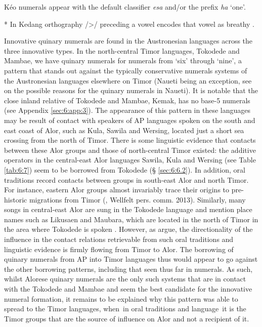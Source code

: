 \begin{table}
\vspace{.5cm}
\normalsize
  {\dag} K\'eo numerals appear with the default classifier \textit{{\textglotstop}esa} and/or the prefix \textit{ha} `one'.

      * In Kedang orthography /{\textgreater}/ preceding a vowel encodes that vowel as breathy \citep{Samely1991}.


\label{tab:6:10}
\end{table}

    Innovative quinary numerals are found in the Austronesian languages across the three innovative types. In the north-central Timor languages, Tokodede and Mambae, we have quinary numerals for numerals from `six' through `nine', a pattern that stands out against the typically conservative numerals systems of the Austronesian languages elsewhere on Timor (Naueti being an exception, see \citet{SchapperEtAl2013} on the possible reasons for the quinary numerals in Naueti). It is notable that the close inland relative of Tokodede and Mambae, Kemak, has no base-5 numerals (see Appendix \ref{sec:6:app:3}). The appearance of this pattern in these languages may be result of contact with speakers of AP languages spoken on the south and east coast of Alor, such as Kula, Sawila and Wersing, located just a short sea crossing from the north of Timor. There is some linguistic evidence that contacts between these Alor groups and those of north-central Timor existed: the additive operators in the central-east Alor languages Sawila, Kula and Wersing (see Table \ref{tab:6:7}) seem to be borrowed from Tokodede ({\S} \ref{sec:6:6.2}). In addition, oral traditions record contacts between groups in south-east Alor and north Timor. For instance, eastern Alor groups almost invariably trace their origins to pre-historic migrations from Timor (\citealt{WellfeltEtAl2013}, Wellfelt pers. comm. 2013). Similarly, many songs in central-east Alor are sung in the Tokodede language and mention place names such as Likusaen and Maubara, which are located in the north of Timor in the area where Tokodede is spoken \citep{WellfeltEtAl2013}. However, as \citet{WellfeltEtAl2013} argue, the directionality of the influence in the contact relations retrievable from such oral traditions and linguistic evidence is firmly flowing from Timor to Alor. The borrowing of quinary numerals from AP into Timor languages thus would appear to go against the other borrowing patterns, including that seen thus far in numerals. As such, whilst Alorese quinary numerals are the only such systems that are in contact with the Tokodede and Mambae and seem the best candidate for the innovative numeral formation, it remains to be explained why this pattern was able to spread to the Timor languages, when~in oral traditions and language~it is the Timor groups that are the source of influence on Alor and not a recipient of it.

